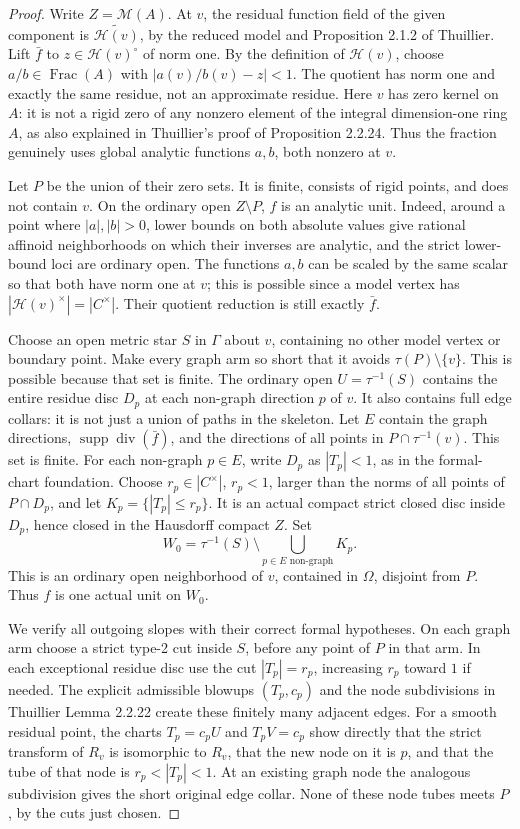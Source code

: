 \documentclass[11pt]{article}
\newcommand{\supp}{\operatorname{supp}}
\begin{document}
\begin{proof}
Write $Z=\mathcal{M}(A)$. At $v$, the residual function field of the
given component is $\widetilde{\mathcal{H}(v)}$, by the reduced model
and Proposition 2.1.2 of Thuillier. Lift $\bar f$ to
$z\in\mathcal{H}(v)^\circ$ of norm one. By the definition of
$\mathcal{H}(v)$, choose $a/b\in\operatorname{Frac}(A)$ with
$|a(v)/b(v)-z|<1$. The quotient has norm one and exactly the same
residue, not an approximate residue. Here $v$ has zero kernel on
$A$: it is not a rigid zero of any nonzero element of the integral
dimension-one ring $A$, as also explained in Thuillier's proof of
Proposition 2.2.24. Thus the fraction genuinely uses global analytic
functions $a,b$, both nonzero at $v$.

Let $P$ be the union of their zero sets. It is finite, consists of
rigid points, and does not contain $v$. On the ordinary open
$Z\setminus P$, $f$ is an analytic unit. Indeed, around a point
where $|a|,|b|>0$, lower bounds on both absolute values give rational
affinoid neighborhoods on which their inverses are analytic, and
the strict lower-bound loci are ordinary open.
The functions $a,b$ can be scaled by the same scalar so that both
have norm one at $v$; this is possible since a model vertex has
$|\mathcal{H}(v)^\times|=|C^\times|$. Their quotient reduction is
still exactly $\bar f$.

Choose an open metric star $S$ in $\Gamma$ about $v$, containing
no other model vertex or boundary point. Make every graph arm so
short that it avoids $\tau(P)\setminus\{v\}$. This is possible
because that set is finite. The ordinary open $U=\tau^{-1}(S)$
contains the entire residue disc $D_p$ at each non-graph direction
$p$ of $v$. It also contains full edge collars: it is not just a
union of paths in the skeleton.
Let $E$ contain the graph directions, $\supp\operatorname{div}(\bar f)$,
and the directions of all points in $P\cap\tau^{-1}(v)$.
This set is finite. For each non-graph $p\in E$, write $D_p$ as
$|T_p|<1$, as in the formal-chart foundation. Choose
$r_p\in|C^\times|$, $r_p<1$, larger than the norms of all points
of $P\cap D_p$, and let $K_p=\{|T_p|\leq r_p\}$.
It is an actual compact strict closed disc inside $D_p$, hence
closed in the Hausdorff compact $Z$. Set
\[
                     W_0=\tau^{-1}(S)\setminus\bigcup_{p\in E\text{ non-graph}}K_p.
\]
This is an ordinary open neighborhood of $v$, contained in
$\Omega$, disjoint from $P$. Thus $f$ is one actual unit on $W_0$.

We verify all outgoing slopes with their correct formal hypotheses.
On each graph arm choose a strict type-2 cut inside $S$, before
any point of $P$ in that arm. In each exceptional residue disc
use the cut $|T_p|=r_p$, increasing $r_p$ toward $1$ if needed.
The explicit admissible blowups $(T_p,c_p)$ and the node subdivisions
in Thuillier Lemma 2.2.22 create these finitely many adjacent edges.
For a smooth residual point, the charts $T_p=c_pU$ and $T_pV=c_p$
show directly that the strict transform of $R_v$ is isomorphic to
$R_v$, that the new node on it is $p$, and that the tube of that
node is $r_p<|T_p|<1$. At an existing graph node the analogous
subdivision gives the short original edge collar. None of these
node tubes meets $P$, by the cuts just chosen.


\end{proof}
\end{document}
